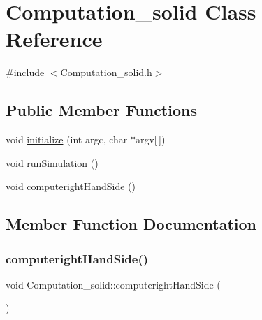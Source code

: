 \hypertarget{classComputation__solid}{}\section{Computation\+\_\+solid Class Reference}
\label{classComputation__solid}


{\ttfamily \#include $<$Computation\+\_\+solid.\+h$>$}

\subsection*{Public Member Functions}
\begin{DoxyCompactItemize}
\item 
void \mbox{\hyperlink{classComputation__solid_a01304db4bd2d879c221f22a2e1268e86}{initialize}} (int argc, char $\ast$argv\mbox{[}$\,$\mbox{]})
\item 
void \mbox{\hyperlink{classComputation__solid_a5460ead715cf41883b0abd060e348e12}{run\+Simulation}} ()
\item 
void \mbox{\hyperlink{classComputation__solid_afd38b26f5d5481f99a80583024367f95}{computeright\+Hand\+Side}} ()
\end{DoxyCompactItemize}


\subsection{Member Function Documentation}
\mbox{\label{classComputation__solid_afd38b26f5d5481f99a80583024367f95}} 
\subsubsection{\texorpdfstring{computerightHandSide()}{computerightHandSide()}}
{\footnotesize\ttfamily void Computation\+\_\+solid\+::computeright\+Hand\+Side (\begin{DoxyParamCaption}{ }\end{DoxyParamCaption})}

\mbox{\label{classComputation__solid_a01304db4bd2d879c221f22a2e1268e86}} 
